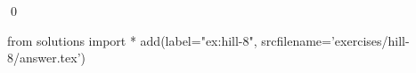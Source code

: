 
\begin{ex} 
  \label{ex:hill-8}
  
  \qed
\end{ex} 
\begin{python0}
from solutions import *
add(label="ex:hill-8",
    srcfilename='exercises/hill-8/answer.tex') 
\end{python0}
